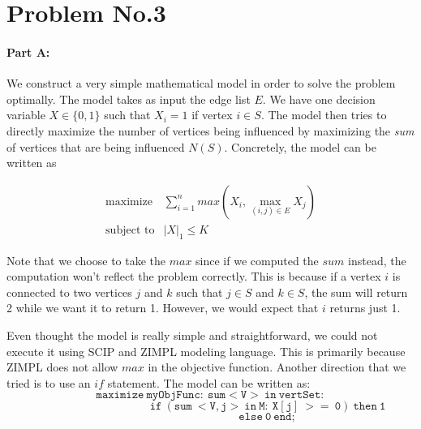 \section*{Problem No.3} \label{sec:prob3}
\paragraph{Part A:}
We construct a very simple mathematical model in order to solve the problem optimally. The model takes as input the edge list $E$. We have one decision variable $X \in \{0,1\}$ such that $X_{i}=1$ if vertex $i \in S$. The model then tries to directly maximize the number of vertices being influenced by maximizing the \emph{sum} of vertices that are being influenced $N(S)$. Concretely, the model can be written as 

\[
\begin{array}{cl}
\text{maximize} &  \sum_{i=1}^{n} max\left( X_{i}, \max_{(i,j)\in E}X_j \right)\\
\text{subject to} & |X|_{1} \leq K
\end{array} 
\]

Note that we choose to take the $max$ since if we computed the $sum$ instead, the computation won't reflect the problem correctly. This is because if a vertex $i$ is connected to two vertices $j$ and $k$ such that $j \in S$ and $k \in S$, the sum will return 2 while we want it to return 1. However, we would expect that $i$ returns just 1. 


Even thought the model is really simple and straightforward, we could not execute it using SCIP and ZIMPL modeling language. This is primarily because ZIMPL does not allow $max$ in the objective function. Another direction that we tried is to use an $if$ statement. The model can be written as:
\mathleft
\[
\mathtt{maximize\ myObjFunc:\ sum <V>\ in\ vertSet: } 
\]
\[
\qquad \qquad \qquad \qquad \qquad \mathtt{if\ (sum\ <V,j>\ in\ M:\ X[j]\ >=\ 0)\ then\ 1}
\]
\[
\qquad \qquad \qquad \qquad \qquad \mathtt{else\ 0\ end;}
\]


